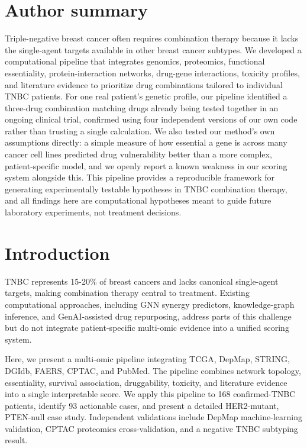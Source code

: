 \documentclass[10pt,letterpaper]{article}
\begin{document}
\section*{Author summary}
Triple-negative breast cancer often requires combination therapy because it lacks the single-agent targets available in other breast cancer subtypes. We developed a computational pipeline that integrates genomics, proteomics, functional essentiality, protein-interaction networks, drug-gene interactions, toxicity profiles, and literature evidence to prioritize drug combinations tailored to individual TNBC patients. For one real patient's genetic profile, our pipeline identified a three-drug combination matching drugs already being tested together in an ongoing clinical trial, confirmed using four independent versions of our own code rather than trusting a single calculation. We also tested our method's own assumptions directly: a simple measure of how essential a gene is across many cancer cell lines predicted drug vulnerability better than a more complex, patient-specific model, and we openly report a known weakness in our scoring system alongside this. This pipeline provides a reproducible framework for generating experimentally testable hypotheses in TNBC combination therapy, and all findings here are computational hypotheses meant to guide future laboratory experiments, not treatment decisions.

\clearpage
{}
\linenumbers

\section*{Introduction}
TNBC represents 15-20\% of breast cancers and lacks canonical single-agent targets, making combination therapy central to treatment. Existing computational approaches, including GNN synergy predictors, knowledge-graph inference, and GenAI-assisted drug repurposing, address parts of this challenge but do not integrate patient-specific multi-omic evidence into a unified scoring system.

Here, we present a multi-omic pipeline integrating TCGA, DepMap, STRING, DGIdb, FAERS, CPTAC, and PubMed. The pipeline combines network topology, essentiality, survival association, druggability, toxicity, and literature evidence into a single interpretable score. We apply this pipeline to 168 confirmed-TNBC patients, identify 93 actionable cases, and present a detailed HER2-mutant, PTEN-null case study. Independent validations include DepMap machine-learning validation, CPTAC proteomics cross-validation, and a negative TNBC subtyping result.
\end{document}
